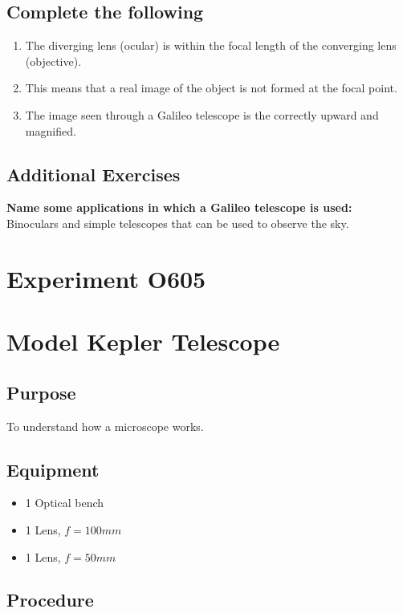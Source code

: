 \documentclass[12pt]{article}
\begin{document}
\subsection*{Complete the following}
\begin{enumerate}
    \item The diverging lens (ocular) is within the focal length of the converging lens (objective). 
    \item This means that a real image of the object is not formed at the focal point. 
    \item The image seen through a Galileo telescope is the correctly upward and magnified. 
\end{enumerate}

\subsection*{Additional Exercises}
\textbf{Name some applications in which a Galileo telescope is used:}\\
Binoculars and simple telescopes that can be used to observe the sky. 

\newpage

\section*{Experiment O605}

\section*{Model Kepler Telescope}

\subsection*{Purpose}

To understand how a microscope works.

\subsection*{Equipment}

\begin{itemize}
\item 1 Optical bench
\item 1 Lens, $f=100 mm$
\item 1 Lens, $f=50 mm$
\end{itemize}

\subsection*{Procedure}
\end{document}
